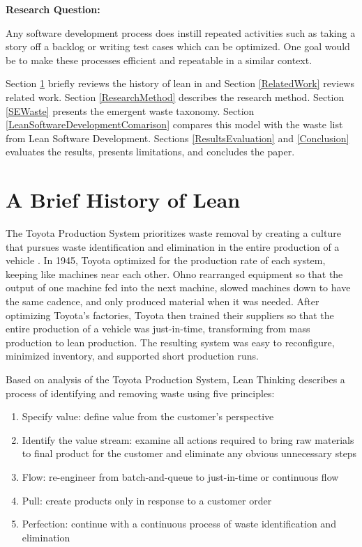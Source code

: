\textbf{Research Question: }

Any software development process does instill repeated activities such as taking a story off a backlog or writing test cases which can be optimized. One goal would be to make these processes efficient and repeatable in a similar context. 

Section \ref{HistoryOfLean} briefly reviews the history of lean in and Section \ref{RelatedWork} reviews related work. Section \ref{ResearchMethod} describes the research method. Section \ref{SEWaste} presents the emergent waste taxonomy. Section \ref{LeanSoftwareDevelopmentComarison} compares this model with the waste list from Lean Software Development. Sections \ref{ResultsEvaluation} and \ref{Conclusion} evaluates the results, presents limitations, and concludes the paper.

\section{A Brief History of Lean}
\label{HistoryOfLean}

The Toyota Production System prioritizes waste removal by creating a culture that pursues waste identification and elimination in the entire production of a vehicle \cite{OhnoToyotaProductionSystem, ShingoToyotaProductionSystem}. In 1945, Toyota optimized for the production rate of each system, keeping like machines near each other. Ohno rearranged equipment so that the output of one machine fed into the next machine, slowed machines down to have the same cadence, and only produced material when it was needed. After optimizing Toyota's factories, Toyota then trained their suppliers so that the entire production of a vehicle was just-in-time, transforming from mass production to lean production. The resulting  system was easy to reconfigure, minimized inventory, and supported short production runs.  

Based on analysis of the Toyota Production System, Lean Thinking \cite{WomackLeanThinking} describes a process of identifying and removing waste using five principles:
\begin{enumerate}
\item Specify value: define value from the customer's perspective
\item Identify the value stream: examine all actions required to bring raw materials to final product for the customer and eliminate any obvious unnecessary steps
\item Flow: re-engineer from batch-and-queue to just-in-time or continuous flow 
\item Pull: create products only in response to a customer order
\item Perfection: continue with a continuous process of waste identification and elimination
\end{enumerate}

